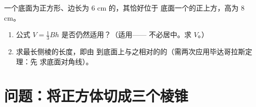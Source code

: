 \begin{exercise}[$\star\star\star$]\label{exo:g8:solids:11}
一个底面为正方形、边长为 $6$ cm 的，其恰好位于
底面一个的正上方，高为 $8$ cm。
\begin{enumerate}
  \item 公式 $V = \frac13 Bh$ 是否仍然适用？（适用——
        不必居中。求 $V$。）
  \item 求最长侧棱的长度，即由
        到底面上与之相对的的（需两次应用毕达哥拉斯定理：先
        求底面对角线）。
\end{enumerate}
\end{exercise}

\section{问题：将正方体切成三个棱锥}

